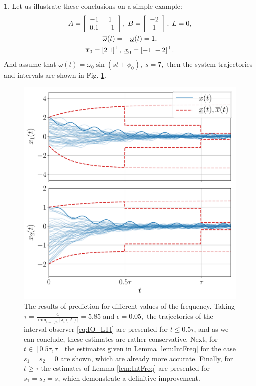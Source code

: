 \documentclass[letterpaper, 10 pt, conference]{ieeeconf}
\theoremstyle{plain}
\theoremstyle{definition}
\newtheorem*{example*}{\protect\examplename}
\theoremstyle{plain}
\theoremstyle{plain}
\theoremstyle{remark}
\providecommand{\examplename}{Example}
\begin{document}
\begin{example*}
Let us illustrate these conclusions on a simple example:
\begin{gather*}
A=\left[\begin{array}{cc}
-1 & 1\\
0.1 & -1
\end{array}\right],\;B=\left[\begin{array}{c}
-2\\
1
\end{array}\right],\;L=0,\\
\overline{\omega}(t)=-\underline{\omega}(t)=1,\\
\overline{x}_{0}=[2\;1]^{\top},\;\underline{x}_{0}=[-1\;-2]^{\top}.
\end{gather*}
And assume that
$
\omega(t)=\omega_0\sin(st+\phi_0),\;s=7,
$
then the system trajectories and intervals are shown in Fig. \ref{fig:IntFreq}. 
\begin{figure}
\begin{centering}
\includegraphics[width=\linewidth]{asymptotic}
\par\end{centering}
\caption{\label{fig:IntFreq} The results of prediction for different values
of the frequency. Taking $\tau=\frac{4}{\min_{i=\overline{1,n}}|\lambda_{i}(A)|}=5.85$ and $\epsilon=0.05,$ the trajectories of the interval observer \eqref{eq:IO_LTI} are presented for $t\leq0.5\tau$, and as we can conclude, these estimates are rather conservative. Next, for $t\in[0.5\tau,\tau]$ the estimates given in Lemma \ref{lem:IntFreq} for the case $s_{1}=s_{2}=0$ are shown, which are already more accurate. Finally, for $t\geq\tau$ the estimates of Lemma \ref{lem:IntFreq} are presented for $s_{1}=s_{2}=s$, which demonstrate a definitive improvement. }
\end{figure}
\end{example*}
\end{document}
